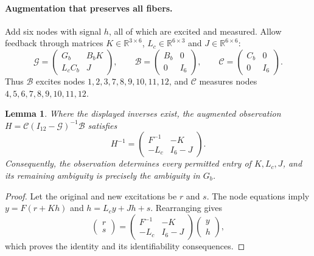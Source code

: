 \documentclass[11pt,a4paper]{article}
\newtheorem{lemma}{Lemma}
\begin{document}
\paragraph{Augmentation that preserves all fibers.}
Add six nodes with signal $h$, all of which are excited and measured.
Allow feedback through matrices $K\in\mathbb R^{3\times6}$,
$L_c\in\mathbb R^{6\times3}$ and $J\in\mathbb R^{6\times6}$:
\begin{equation}\label{eq:aug}
 \mathcal G=\begin{pmatrix}G_b&B_bK\\L_cC_b&J\end{pmatrix},\qquad
 \mathcal B=\begin{pmatrix}B_b&0\\0&I_6\end{pmatrix},\qquad
 \mathcal C=\begin{pmatrix}C_b&0\\0&I_6\end{pmatrix}.
\end{equation}
Thus $\mathcal B$ excites nodes $1,2,3,7,8,9,10,11,12$, and
$\mathcal C$ measures nodes $4,5,6,7,8,9,10,11,12$.

\begin{lemma}\label{lem:inverse}
Where the displayed inverses exist, the augmented observation
$H=\mathcal C(I_{12}-\mathcal G)^{-1}\mathcal B$ satisfies
\begin{equation}\label{eq:inverse}
 H^{-1}=\begin{pmatrix}F^{-1}&-K\\-L_c&I_6-J\end{pmatrix}.
\end{equation}
Consequently, the observation determines every permitted entry of
$K,L_c,J$, and its remaining ambiguity is precisely the ambiguity in $G_b$.
\end{lemma}
\begin{proof}
Let the original and new excitations be $r$ and $s$. The node equations imply
$y=F(r+Kh)$ and $h=L_cy+Jh+s$. Rearranging gives
\[
 \begin{pmatrix}r\\s\end{pmatrix}
 =\begin{pmatrix}F^{-1}&-K\\-L_c&I_6-J\end{pmatrix}
  \begin{pmatrix}y\\h\end{pmatrix},
\]
which proves the identity and its identifiability consequences.
\end{proof}
\end{document}
